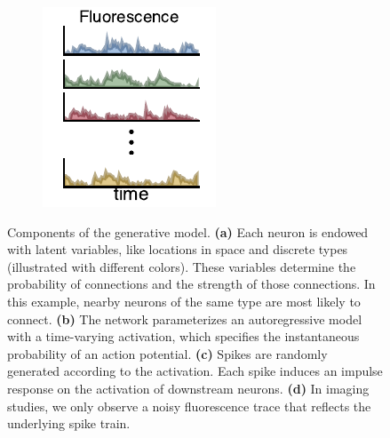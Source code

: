 \begin{figure}[t]
\begin{subfigure}[b]{1.3in}
     \label{fig:fig1_spikes}
   \end{subfigure}
   \begin{subfigure}[b]{1.3in}
     \centering
     \caption{}
     \vspace{-.25in}
     \includegraphics[width=\textwidth]{figures/ch3/new_observed_fluorescence}
     \label{fig:fig1_fluorescence}
   \end{subfigure}
   \vspace{-.2in}
   \caption{Components of the generative model. 
     \textbf{(a)} Each neuron is endowed with latent variables, like 
     locations in space and discrete types (illustrated with different colors).
     These variables determine the probability of connections and the 
     strength of those connections. In this example, nearby neurons of the same 
     type are most likely to connect.
     \textbf{(b)} The network parameterizes an autoregressive model 
     with a time-varying activation, which specifies the instantaneous probability 
     of an action potential.
     \textbf{(c)} Spikes are randomly generated according to the 
     activation. Each spike induces an impulse response on the activation 
     of downstream neurons.
     \textbf{(d)} In imaging studies, we only observe a noisy fluorescence 
     trace that reflects the underlying spike train.}
 \label{fig:fig1}
 \end{figure}

